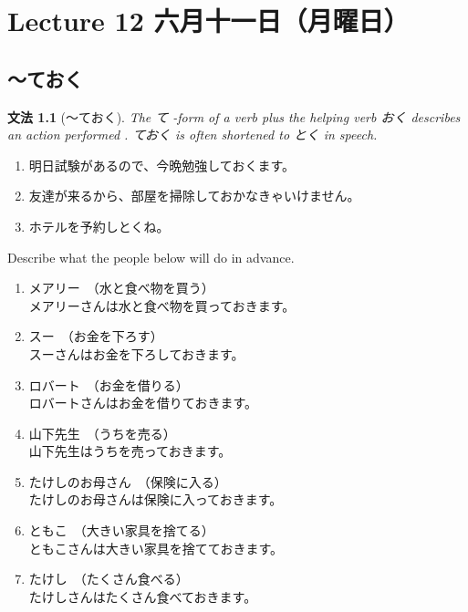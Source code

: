 \documentclass[notoc,notitlepage]{tufte-book}
\newtheorem{grammar}{文法}[section]
\begin{document}
\chapter{Lecture 12 六月十一日（月曜日）}%
\label{chp:lecture_12_liu_yue_shi_yi_ri_yue_yao_ri_}

\section{〜ておく}%
\label{sec:_teoku}

\begin{grammar}[〜ておく]
\label{grammar:_teoku}
The て -form of a verb plus the helping verb おく describes an action performed . ておく is often shortened to とく in speech.
\end{grammar}

\begin{eg}
  \begin{enumerate}
    \item 明日試験があるので、今晩勉強しておくます。
    \item 友達が来るから、部屋を掃除しておかなきゃいけません。
    \item ホテルを予約しとくね。
  \end{enumerate}
\end{eg}

\begin{ex}
  Describe what the people below will do in advance.

  \begin{enumerate}
    \item メアリー　（水と食べ物を買う） \\
      メアリーさんは水と食べ物を買っておきます。
    \item スー　（お金を下ろす）\\
      スーさんはお金を下ろしておきます。
    \item ロバート　（お金を借りる）\\
      ロバートさんはお金を借りておきます。
    \item 山下先生　（うちを売る） \\
      山下先生はうちを売っておきます。
    \item たけしのお母さん　（保険に入る）\\
      たけしのお母さんは保険に入っておきます。
    \item ともこ　（大きい家具を捨てる）\\
      ともこさんは大きい家具を捨てておきます。
    \item たけし　（たくさん食べる）\\
      たけしさんはたくさん食べておきます。
  \end{enumerate}
\end{ex}
\end{document}
